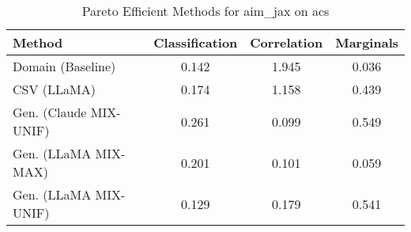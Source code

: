 \begin{table}[t!]
    \centering
    \caption{Pareto Efficient Methods for aim_jax on acs}
    \label{tab:pareto_efficient_methods_aim_jax_acs}
    \begin{tabular}{lccc}
    \toprule
    Method & Classification & Correlation & Marginals \\
    \midrule
    Domain (Baseline) & \cellcolor{silver!30}0.142 & 1.945 & \cellcolor{gold!30}0.036 \\
    CSV (LLaMA) & \cellcolor{bronze!30}0.174 & 1.158 & \cellcolor{bronze!30}0.439 \\
    Gen. (Claude MIX-UNIF) & 0.261 & \cellcolor{gold!30}0.099 & 0.549 \\
    Gen. (LLaMA MIX-MAX) & 0.201 & \cellcolor{silver!30}0.101 & \cellcolor{silver!30}0.059 \\
    Gen. (LLaMA MIX-UNIF) & \cellcolor{gold!30}0.129 & \cellcolor{bronze!30}0.179 & 0.541 \\
    \bottomrule
    \end{tabular}
\end{table}